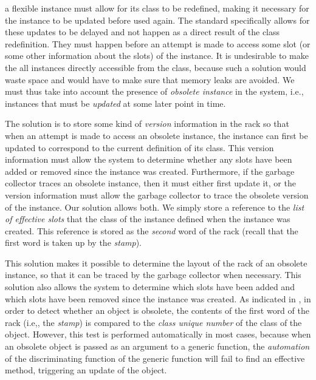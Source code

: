 a flexible instance must allow for its class to be redefined, making
it necessary for the instance to be updated before used again.  The
standard specifically allows for these updates to be delayed and not
happen as a direct result of the class redefinition.  They must happen
before an attempt is made to access some slot (or some other
information about the slots) of the instance.  It is undesirable to
make the all instances directly accessible from the class, because
such a solution would waste space and would have to make sure that
memory leaks are avoided.  We must thus take into account the presence
of \emph{obsolete instance} in the system, i.e., instances that must
be \emph{updated} at some later point in time.

The solution is to store some kind of \emph{version} information in
the rack so that when an attempt is made to access an
obsolete instance, the instance can first be updated to correspond to
the current definition of its class.  This version information must
allow the system to determine whether any slots have been added or
removed since the instance was created.  Furthermore, if the garbage
collector traces an obsolete instance, then it must either first
update it, or the version information must allow the garbage collector
to trace the obsolete version of the instance.  Our solution allows
both.  We simply store a reference to the \emph{list of effective
  slots} that the class of the instance defined when the instance was
created.  This reference is stored as the \emph{second} word of the
rack (recall that the first word is taken up by the
\emph{stamp}). 

This solution makes it possible to determine the layout of the
rack of an obsolete instance, so that it can be traced by
the garbage collector when necessary.  This solution also allows the
system to determine which slots have been added and which slots have
been removed since the instance was created.  As indicated in
, in order to detect
whether an object is obsolete, the contents of the first word of the
rack (i.e,, the \emph{stamp}) is compared to the
\emph{class unique number} of the class of the object.  However, this
test is performed automatically in most cases, because when an
obsolete object is passed as an argument to a generic function, the
\emph{automation} of the discriminating function of the generic
function will fail to find an effective method, triggering an update
of the object.

